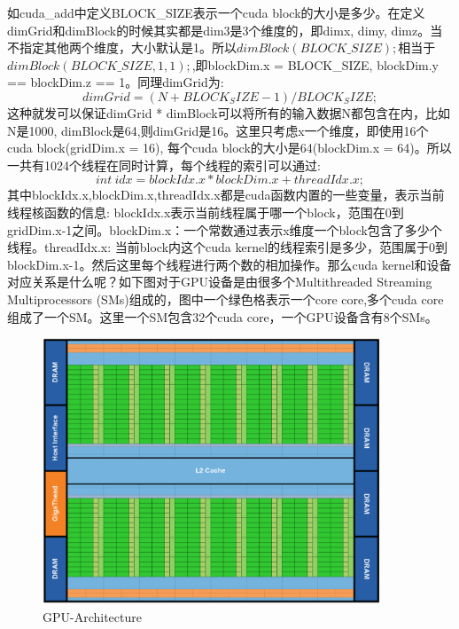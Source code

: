 \documentclass[12pt]{book}
\begin{document}
如cuda\_add中定义BLOCK\_SIZE表示一个cuda block的大小是多少。在定义dimGrid和dimBlock的时候其实都是dim3是3个维度的，即dimx, dimy, dimz。当不指定其他两个维度，大小默认是1。所以$ dimBlock(BLOCK\_SIZE);$相当于$dimBlock(BLOCK\_SIZE, 1, 1);$,即blockDim.x = BLOCK\_SIZE, blockDim.y == blockDim.z == 1。同理dimGrid为:
\begin{equation}\label{compute-dim-grid}
dimGrid = (N + BLOCK_SIZE - 1) / BLOCK_SIZE;
\end{equation}
这种就发可以保证dimGrid * dimBlock可以将所有的输入数据N都包含在内，比如N是1000, dimBlock是64,则dimGrid是16。这里只考虑x一个维度，即使用16个cuda block(gridDim.x = 16), 每个cuda block的大小是64(blockDim.x = 64)。所以一共有1024个线程在同时计算，每个线程的索引可以通过:
\begin{equation}\label{compute-cuda-thread-idx}
int\ idx = blockIdx.x * blockDim.x + threadIdx.x;
\end{equation}
其中blockIdx.x,blockDim.x,threadIdx.x都是cuda函数内置的一些变量，表示当前线程核函数的信息: blockIdx.x表示当前线程属于哪一个block，范围在0到gridDim.x-1之间。blockDim.x：一个常数通过表示x维度一个block包含了多少个线程。threadIdx.x: 当前block内这个cuda kernel的线程索引是多少，范围属于0到blockDim.x-1。然后这里每个线程进行两个数的相加操作。那么cuda kernel和设备对应关系是什么呢？如下图对于GPU设备是由很多个Multithreaded Streaming Multiprocessors (SMs)组成的，图中一个绿色格表示一个core core,多个cuda core组成了一个SM。这里一个SM包含32个cuda core，一个GPU设备含有8个SMs。
\begin{figure}[H]
	\centering
	\includegraphics[width=0.9\textwidth]{images/GPU-Architecture.png}
	\caption{GPU-Architecture}
	\label{GPU-Architecture}
\end{figure}
\end{document}

